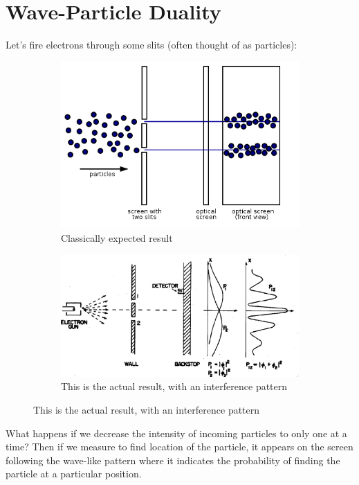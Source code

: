 \documentclass[a4paper, 11pt, normalem]{report}
\begin{document}
\section{Wave-Particle Duality}
Let's fire electrons through some slits (often thought of as particles):
\begin{figure}[H]
    \centering
    \begin{subfigure}{0.6\textwidth}
        \caption{Classically expected result}
        \includegraphics[width=\textwidth]{ClassicalDouble.png}
    \end{subfigure}

    \begin{subfigure}{0.8\textwidth}
        \caption{This is the actual result, with an interference pattern}
        \includegraphics[width=\textwidth]{ActualDouble.png}
    \end{subfigure}
\end{figure}
What happens if we decrease the intensity of incoming particles to only one at a time?
Then if we measure to find location of the particle, it appears on the screen following the wave-like pattern where it indicates the probability of finding the particle at a particular position.
\end{document}

